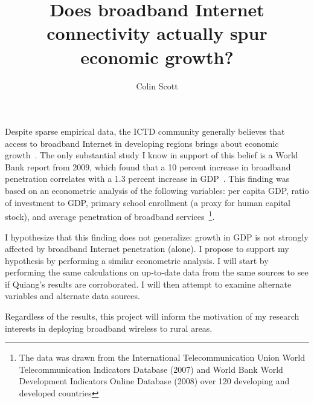 \documentclass[10pt]{article}
\title{Does broadband Internet connectivity actually spur economic growth?}
\author{Colin Scott}
\begin{document}
\maketitle

Despite sparse empirical data, the ICTD community generally believes that access
to broadband Internet in developing regions brings about economic growth~\cite{brewer2005case}.
The only substantial study I know in support of this belief is a World Bank report
from 2009, which found that a 10 percent increase in broadband penetration
correlates with a 1.3 percent increase in GDP~\cite{qiang2009economic}. This
finding was based on an econometric analysis of the following
variables: per capita GDP, ratio of
investment to GDP, primary school enrollment (a proxy for human capital stock),
and average penetration of broadband services~\footnote{The data was drawn
from the International Telecommunication Union World
Telecommunication Indicators Database (2007) and World Bank World Development Indicators Online
Database (2008) over 120 developing
and developed countries}.

I hypothesize that this finding does not generalize: growth in GDP is not
strongly affected by broadband Internet penetration (alone). I propose to
support my hypothesis by performing a similar econometric analysis. I will
start by performing the same calculations on up-to-date data from the same
sources to see if
Quiang's results are corroborated. I will then attempt to examine alternate
variables and alternate data sources.

Regardless of the results, this project
will inform the motivation of my research interests in deploying broadband
wireless to rural areas.



\end{document}
